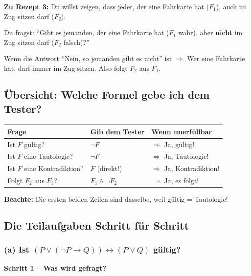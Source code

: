 \documentclass[a4paper,12pt]{article}
\begin{document}
\begin{analogie}
\textbf{Zu Rezept 3:} Du willst zeigen, dass jeder, der eine Fahrkarte hat ($F_1$),
auch im Zug sitzen darf ($F_2$).

\medskip
Du fragst: "`Gibt es jemanden, der eine Fahrkarte hat ($F_1$ wahr),
aber \textbf{nicht} im Zug sitzen darf ($F_2$ falsch)?"'

\medskip
Wenn die Antwort "`Nein, so jemanden gibt es nicht"' ist $\Rightarrow$
Wer eine Fahrkarte hat, darf immer im Zug sitzen. Also folgt $F_2$ aus $F_1$.
\end{analogie}

\subsection{\"Ubersicht: Welche Formel gebe ich dem Tester?}

\begin{merkbox}[title={Umformulierungen auf einen Blick}]
\renewcommand{\arraystretch}{1.5}
\begin{tabular}{l|l|l}
\textbf{Frage} & \textbf{Gib dem Tester} & \textbf{Wenn unerf\"ullbar} \\
\hline
Ist $F$ g\"ultig? & $\neg F$ & $\Rightarrow$ Ja, g\"ultig! \\
Ist $F$ eine Tautologie? & $\neg F$ & $\Rightarrow$ Ja, Tautologie! \\
Ist $F$ eine Kontradiktion? & $F$ (direkt!) & $\Rightarrow$ Ja, Kontradiktion! \\
Folgt $F_2$ aus $F_1$? & $F_1 \wedge \neg F_2$ & $\Rightarrow$ Ja, es folgt! \\
\end{tabular}

\medskip
\textbf{Beachte:} Die ersten beiden Zeilen sind dasselbe, weil
g\"ultig = Tautologie!
\end{merkbox}

\subsection{Die Teilaufgaben Schritt f\"ur Schritt}

\subsubsection*{(a) Ist $(P \vee (\neg P \to Q)) \leftrightarrow (P \vee Q)$ g\"ultig?}

\textbf{Schritt 1 -- Was wird gefragt?}
\end{document}
